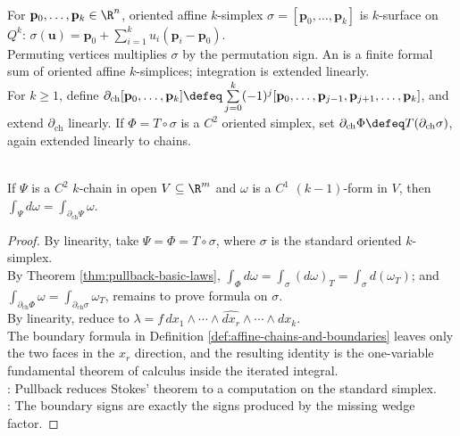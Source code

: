 \begin{definition} \label{def:affine-chains-and-boundaries} \\
For $\mathbf{p}_0,\ldots,\mathbf{p}_k\in\R^n$, oriented affine $k$-simplex $\sigma=[\mathbf{p}_0,\ldots,\mathbf{p}_k]$ is $k$-surface on $Q^k$: $\sigma(\mathbf{u})=\mathbf{p}_0+\sum\limits_{i=1}^{k}u_i(\mathbf{p}_i-\mathbf{p}_0)$.\\
Permuting vertices multiplies $\sigma$ by the permutation sign. An  is a finite formal sum of oriented affine $k$-simplices; integration is extended linearly.\\
For $k\geq1$, define $\partial_{\mathrm{ch}}[\mathbf{p}_0,\ldots,\mathbf{p}_k] \defeq \sum\limits_{j=0}^{k}(-1)^j[\mathbf{p}_0,\ldots,\mathbf{p}_{j-1},\mathbf{p}_{j+1},\ldots,\mathbf{p}_k]$, and extend $\partial_{\mathrm{ch}}$ linearly. If $\Phi=T\circ\sigma$ is a $C^2$ oriented simplex, set $\partial_{\mathrm{ch}}\Phi\defeq T(\partial_{\mathrm{ch}}\sigma)$, again extended linearly to chains.
\end{definition}

\begin{theorem} \label{thm:stokes-theorem-differential-forms}\label{thm:forms-manifolds-stokes-main-source-todo} \\
If $\Psi$ is a $C^2$ $k$-chain in open $V\subseteq\R^m$ and $\omega$ is a $C^1$ $(k-1)$-form in $V$, then $\int_{\Psi}d\omega=\int_{\partial_{\mathrm{ch}}\Psi}\omega$.
\begin{proof}
By linearity, take $\Psi=\Phi=T\circ\sigma$, where $\sigma$ is the standard oriented $k$-simplex.\\
By Theorem \ref{thm:pullback-basic-laws}, $\int_{\Phi}d\omega =\int_{\sigma}(d\omega)_T =\int_{\sigma}d(\omega_T)$; and $\int_{\partial_{\mathrm{ch}}\Phi}\omega =\int_{\partial_{\mathrm{ch}}\sigma}\omega_T$, remains to prove formula on $\sigma$.\\
By linearity, reduce to $\lambda=f\,dx_1\wedge\cdots\wedge\widehat{dx_r}\wedge\cdots\wedge dx_k$.\\
The boundary formula in Definition \ref{def:affine-chains-and-boundaries} leaves only the two faces in the $x_r$ direction, and the resulting identity is the one-variable fundamental theorem of calculus inside the iterated integral.\\
: Pullback reduces Stokes' theorem to a computation on the standard simplex.\\
: The boundary signs are exactly the signs produced by the missing wedge factor.
\end{proof}
\end{theorem}

